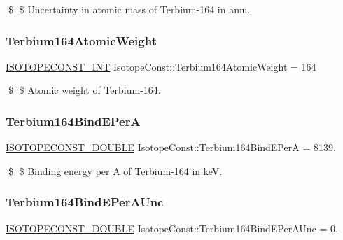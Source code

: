 \$ \$ Uncertainty in atomic mass of Terbium-\/164 in amu. \mbox{\label{group___isotope_const-_terbium-_tb164_ga6a8089039891dc6c1c3aeaec4c45f3ba}} 
\subsubsection{\texorpdfstring{Terbium164\+Atomic\+Weight}{Terbium164AtomicWeight}}
{\footnotesize\ttfamily \mbox{\hyperlink{group___isotope_const-_macros_ga5f18360b3e99483a35c32d789e62621c}{I\+S\+O\+T\+O\+P\+E\+C\+O\+N\+S\+T\+\_\+\+I\+NT}} Isotope\+Const\+::\+Terbium164\+Atomic\+Weight = 164}

\$ \$ Atomic weight of Terbium-\/164. \mbox{\label{group___isotope_const-_terbium-_tb164_ga158fa91093ff1fc35e9f4d7c12ab9b42}} 
\subsubsection{\texorpdfstring{Terbium164\+Bind\+E\+PerA}{Terbium164BindEPerA}}
{\footnotesize\ttfamily \mbox{\hyperlink{group___isotope_const-_macros_ga8f45a7272ce02c0b4c65c44636ed719a}{I\+S\+O\+T\+O\+P\+E\+C\+O\+N\+S\+T\+\_\+\+D\+O\+U\+B\+LE}} Isotope\+Const\+::\+Terbium164\+Bind\+E\+PerA = 8139.}

\$ \$ Binding energy per A of Terbium-\/164 in keV. \mbox{\label{group___isotope_const-_terbium-_tb164_ga5f3f7881969fa0da07c7e99b817cd8c0}} 
\subsubsection{\texorpdfstring{Terbium164\+Bind\+E\+Per\+A\+Unc}{Terbium164BindEPerAUnc}}
{\footnotesize\ttfamily \mbox{\hyperlink{group___isotope_const-_macros_ga8f45a7272ce02c0b4c65c44636ed719a}{I\+S\+O\+T\+O\+P\+E\+C\+O\+N\+S\+T\+\_\+\+D\+O\+U\+B\+LE}} Isotope\+Const\+::\+Terbium164\+Bind\+E\+Per\+A\+Unc = 0.}

